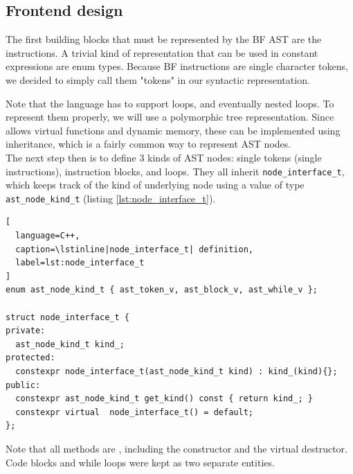 \documentclass[../../main.tex]{subfiles}
\begin{document}

\subsection{Frontend design}

The first building blocks that must be represented by the BF AST are the
instructions. A trivial kind of representation that can be used in constant
expressions are enum types. Because BF instructions are single character tokens,
we decided to simply call them "tokens" in our syntactic representation.



Note that the language has to support loops, and eventually nested loops.
To represent them properly, we will use a polymorphic tree representation.
Since  allows virtual functions and dynamic memory, these can be
implemented using inheritance, which is a fairly common way to represent AST
nodes.\\

The next step then is to define 3 kinds of AST nodes: single tokens (\ie single
instructions), instruction blocks, and loops. They all inherit
\lstinline|node_interface_t|, which keeps track of the kind of underlying node
using a value of type \lstinline{ast_node_kind_t}
(listing \ref{lst:node_interface_t}).

\begin{lstlisting}[
  language=C++,
  caption=\lstinline|node_interface_t| definition,
  label=lst:node_interface_t
]
enum ast_node_kind_t { ast_token_v, ast_block_v, ast_while_v };

struct node_interface_t {
private:
  ast_node_kind_t kind_;
protected:
  constexpr node_interface_t(ast_node_kind_t kind) : kind_(kind){};
public:
  constexpr ast_node_kind_t get_kind() const { return kind_; }
  constexpr virtual  node_interface_t() = default;
};
\end{lstlisting}

% 

Note that all methods are \constexpr, including the constructor and the virtual
destructor. Code blocks and while loops were kept as two separate entities.
\end{document}
